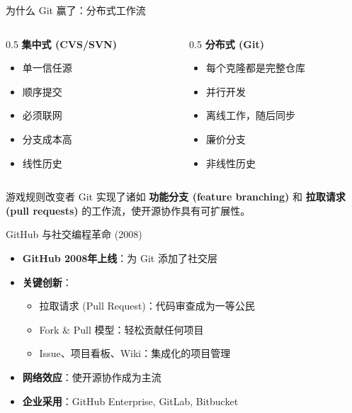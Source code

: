 \documentclass{beamer}
\begin{document}
\begin{frame}[t]{为什么 Git 赢了：分布式工作流}
\begin{columns}
    \begin{column}{0.5\textwidth}
        \textbf{集中式 (CVS/SVN)}
        \begin{itemize}
            \item 单一信任源
            \item 顺序提交
            \item 必须联网
            \item 分支成本高
            \item 线性历史
        \end{itemize}
    \end{column}
    \begin{column}{0.5\textwidth}
        \textbf{分布式 (Git)}
        \begin{itemize}
            \item 每个克隆都是完整仓库
            \item 并行开发
            \item 离线工作，随后同步
            \item 廉价分支
            \item 非线性历史
        \end{itemize}
    \end{column}
\end{columns}
\begin{block}{游戏规则改变者}
Git 实现了诸如 \textbf{功能分支 (feature branching)} 和 \textbf{拉取请求 (pull requests)} 的工作流，使开源协作具有可扩展性。
\end{block}
\end{frame}

\begin{frame}[t]{GitHub 与社交编程革命 (2008)}
\begin{itemize}
    \item \textbf{GitHub 2008年上线}：为 Git 添加了社交层
    \item \textbf{关键创新}：
        \begin{itemize}
            \item 拉取请求 (Pull Request)：代码审查成为一等公民
            \item Fork \& Pull 模型：轻松贡献任何项目
            \item Issue、项目看板、Wiki：集成化的项目管理
        \end{itemize}
    \item \textbf{网络效应}：使开源协作成为主流
    \item \textbf{企业采用}：GitHub Enterprise, GitLab, Bitbucket
\end{itemize}
\end{frame}
\end{document}
